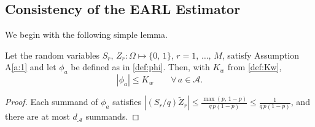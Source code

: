 \documentclass[sigconf,nonacm]{acmart}
\begin{document}
\subsection{Consistency of the EARL Estimator}

We begin with the following simple lemma.
\begin{lemma}\label{lem:weight-bound}
    Let the random variables $S_r,\,Z_r\colon\Omega\mapsto\{0,\,1\}$, $r=1,\,\ldots,\,M$, satisfy Assumption A\ref{a:1} and let $\phi_a$ be defined as in \eqref{def:phi}. Then, with $K_w$ from \eqref{def:Kw},
    \begin{equation*}
        \left|\phi_a\right| \le K_w\qquad \forall\,a\in\mathcal A.
    \end{equation*}
\end{lemma}
\begin{proof}
    Each summand of $\phi_a$ satisfies $|(S_r/q)\tilde Z_r| \le \frac{\max(p,\,1-p)}{q\,p(1-p)} \le \frac{1}{q\,p(1-p)}$, and there are at most $d_{\mathcal A}$ summands.
\end{proof}
\end{document}
